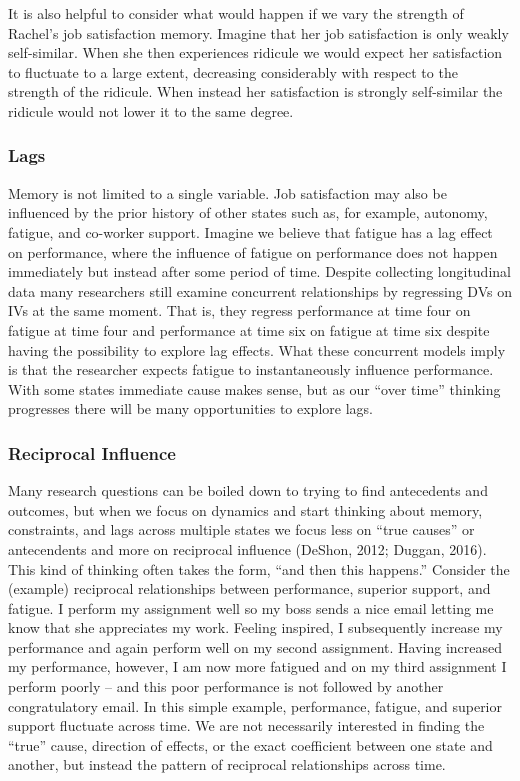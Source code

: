 \documentclass[english,,man]{apa6}
\theoremstyle{definition}
\theoremstyle{definition}
\theoremstyle{definition}
\theoremstyle{remark}
\begin{document}
It is also helpful to consider what would happen if we vary the strength
of Rachel's job satisfaction memory. Imagine that her job satisfaction
is only weakly self-similar. When she then experiences ridicule we would
expect her satisfaction to fluctuate to a large extent, decreasing
considerably with respect to the strength of the ridicule. When instead
her satisfaction is strongly self-similar the ridicule would not lower
it to the same degree.

\hypertarget{lags}{%
\subsubsection{Lags}\label{lags}}

Memory is not limited to a single variable. Job satisfaction may also be
influenced by the prior history of other states such as, for example,
autonomy, fatigue, and co-worker support. Imagine we believe that
fatigue has a lag effect on performance, where the influence of fatigue
on performance does not happen immediately but instead after some period
of time. Despite collecting longitudinal data many researchers still
examine concurrent relationships by regressing DVs on IVs at the same
moment. That is, they regress performance at time four on fatigue at
time four and performance at time six on fatigue at time six despite
having the possibility to explore lag effects. What these concurrent
models imply is that the researcher expects fatigue to instantaneously
influence performance. With some states immediate cause makes sense, but
as our \enquote{over time} thinking progresses there will be many
opportunities to explore lags.

\hypertarget{reciprocal-influence}{%
\subsubsection{Reciprocal Influence}\label{reciprocal-influence}}

Many research questions can be boiled down to trying to find antecedents
and outcomes, but when we focus on dynamics and start thinking about
memory, constraints, and lags across multiple states we focus less on
\enquote{true causes} or antecendents and more on reciprocal influence
(DeShon, 2012; Duggan, 2016). This kind of thinking often takes the
form, \enquote{and then this happens.} Consider the (example) reciprocal
relationships between performance, superior support, and fatigue. I
perform my assignment well so my boss sends a nice email letting me know
that she appreciates my work. Feeling inspired, I subsequently increase
my performance and again perform well on my second assignment. Having
increased my performance, however, I am now more fatigued and on my
third assignment I perform poorly -- and this poor performance is not
followed by another congratulatory email. In this simple example,
performance, fatigue, and superior support fluctuate across time. We are
not necessarily interested in finding the \enquote{true} cause,
direction of effects, or the exact coefficient between one state and
another, but instead the pattern of reciprocal relationships across
time.
\end{document}

